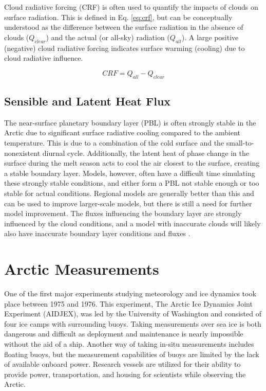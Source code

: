 Cloud radiative forcing (CRF) is often used to quantify the impacts of clouds on surface radiation. This is defined in Eq. \ref{eq:crf}, but can be conceptually understood as the difference between the surface radiation in the absence of clouds ($Q_{clear}$) and the actual (or all-sky) radiation ($Q_{all}$). A large positive (negative) cloud radiative forcing indicates surface warming (cooling) due to cloud radiative influence. 

\begin{equation}\label{eq:crf}
CRF = Q_{all} - Q_{clear}
\end{equation}

\subsection{Sensible and Latent Heat Flux}
The near-surface planetary boundary layer (PBL) is often strongly stable in the Arctic due to significant surface radiative cooling compared to the ambient temperature. This is due to a combination of the cold surface and the small-to-nonexistent diurnal cycle. Additionally, the latent heat of phase change in the surface during the melt season acts to cool the air closest to the surface, creating a stable boundary layer. Models, however, often have a difficult time simulating these strongly stable conditions, and either form a PBL not stable enough or too stable for actual conditions. Regional models are generally better than this and can be used to improve larger-scale models, but there is still a need for further model improvement. The fluxes influencing the boundary layer are strongly influenced by the cloud conditions, and a model with inaccurate clouds will likely also have inaccurate boundary layer conditions and fluxes \citep{tjernstrom:2005}. 

\section{Arctic Measurements}
One of the first major experiments studying meteorology and ice dynamics took place between 1975 and 1976. This experiment, The Arctic Ice Dynamics Joint Experiment (AIDJEX), was led by the University of Washington and consisted of four ice camps with surrounding buoys. Taking measurements over sea ice is both dangerous and difficult as deployment and maintenance is nearly impossible without the aid of a ship. Another way of taking in-situ measurements includes floating buoys, but the measurement capabilities of buoys are limited by the lack of available onboard power. Research vessels are utilized for their ability to provide power, transportation, and housing for scientists while observing the Arctic.

